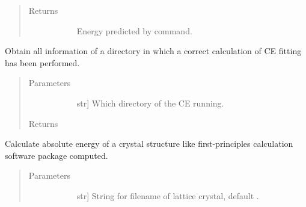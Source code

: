 \documentclass[letterpaper,10pt,english]{sphinxmanual}
\begin{document}
\begin{fulllineitems}
\begin{fulllineitems}
\begin{quote}
\begin{description}
\begin{description}
\end{description}

\item[{Returns}] \leavevmode\begin{description}
\item[{}] \leavevmode
Energy predicted by  command.

\end{description}

\end{description}\end{quote}

\end{fulllineitems}


\begin{fulllineitems}
\label{\detokenize{pygace:pygace.ce.CE.fit}}
Obtain all information of a directory in which a correct calculation of
CE fitting has been performed.
\begin{quote}\begin{description}
\item[{Parameters}] \leavevmode\begin{description}
\item[{}] \leavevmode{[}str{]}
Which directory of the CE running.

\end{description}

\item[{Returns}] \leavevmode\begin{description}
\item[{}] \leavevmode
\end{description}

\end{description}\end{quote}

\end{fulllineitems}


\begin{fulllineitems}
\label{\detokenize{pygace:pygace.ce.CE.get_total_energy}}
Calculate absolute energy of a crystal structure like first-principles
calculation software package computed.
\begin{quote}\begin{description}
\item[{Parameters}] \leavevmode\begin{description}
\item[{}] \leavevmode{[}str{]}
String for filename of lattice crystal, default .


\end{description}
\end{description}
\end{quote}
\end{fulllineitems}
\end{fulllineitems}
\end{document}
